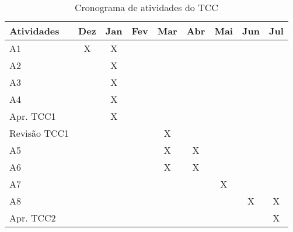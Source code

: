 \renewcommand{\arraystretch}{1.2}
\begin{table}[ht]
    \centering
    \caption{Cronograma de atividades do TCC}
    \begin{tabular}{|l|c|c|c|c|c|c|c|c|}
    \hline
    \cellcolor[HTML]{008940}\textbf{Atividades} & \cellcolor[HTML]{008940}\textbf{Dez} & \cellcolor[HTML]{008940}\textbf{Jan} & \cellcolor[HTML]{008940}\textbf{Fev} & \cellcolor[HTML]{008940}\textbf{Mar} & \cellcolor[HTML]{008940}\textbf{Abr} & \cellcolor[HTML]{008940}\textbf{Mai} & \cellcolor[HTML]{008940}\textbf{Jun} & \cellcolor[HTML]{008940}\textbf{Jul}\\ \hline
    A1 & X & X &   &   &   &   &   &  \\ \hline
    A2 &   & X &   &   &   &   &   &  \\ \hline
    A3 &   & X &   &   &   &   &   &  \\ \hline
    A4 &   & X &   &   &   &   &   &  \\ \hline
    Apr. TCC1 &   & X &   &   &   &   &   &  \\ \hline
    Revisão TCC1 &   &   &   & X &   &   &   &  \\ \hline
    A5 &   &   &   & X & X &   &   &  \\ \hline
    A6 &   &   &   & X & X &   &   &  \\ \hline
    A7 &   &   &   &   &   & X &   &  \\ \hline
    A8 &   &   &   &   &   &   & X & X \\ \hline
    Apr. TCC2 &   &   &   &   &   &   &   & X \\ \hline
    \end{tabular}
    \label{tab:cronograma}
\end{table}
